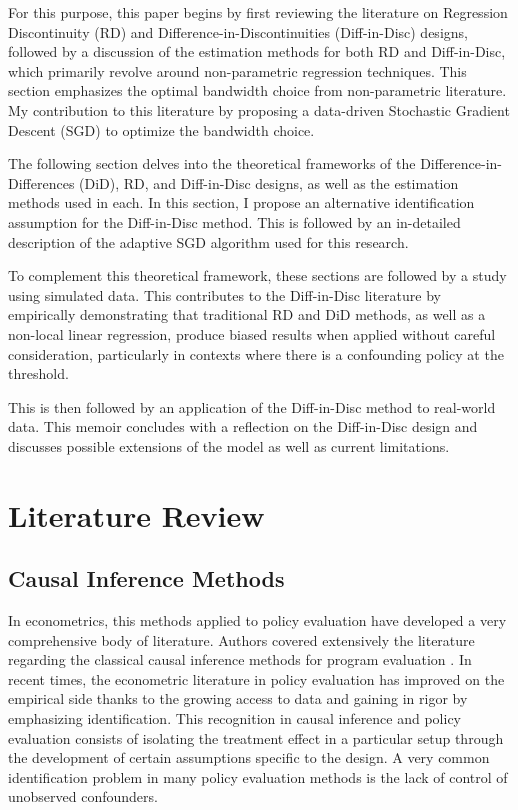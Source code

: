 \documentclass[12pt]{article}
\theoremstyle{plain}
\theoremstyle{remark}
\begin{document}
For this purpose, this paper begins by first reviewing the literature on Regression Discontinuity (RD) and Difference-in-Discontinuities (Diff-in-Disc) designs, followed by a discussion of the estimation methods for both RD and Diff-in-Disc, which primarily revolve around non-parametric regression techniques. This section emphasizes the optimal bandwidth choice from non-parametric literature. My contribution to this literature by proposing a data-driven Stochastic Gradient Descent (SGD) to optimize the bandwidth choice. 

The following section delves into the theoretical frameworks of the Difference-in-Differences (DiD), RD, and Diff-in-Disc designs, as well as the estimation methods used in each. In this section, I propose an alternative identification assumption for the Diff-in-Disc method. 
This is followed by an in-detailed description of the adaptive SGD algorithm used for this research. 

To complement this theoretical framework, these sections are followed by a study using simulated data. This contributes to the Diff-in-Disc literature by empirically demonstrating that traditional RD and DiD methods, as well as a non-local linear regression, produce biased results when applied without careful consideration, particularly in contexts where there is a confounding policy at the threshold.

This is then followed by an application of the Diff-in-Disc method to real-world data. This memoir concludes with a reflection on the Diff-in-Disc design and discusses possible extensions of the model as well as current limitations.
\newpage

\section{Literature Review}

\subsection{Causal Inference Methods}

In econometrics, this methods applied to policy evaluation have developed a very comprehensive body of literature. Authors covered extensively the literature regarding the classical causal inference methods for program evaluation \parencite{Abadie2018Econometric}. In recent times, the econometric literature in policy evaluation has improved on the empirical side thanks to the growing access to data and gaining in rigor by emphasizing identification. This recognition in causal inference and policy evaluation consists of isolating the treatment effect in a particular setup through the development of certain assumptions specific to the design. A very common identification problem in many policy evaluation methods is the lack of control of unobserved confounders.
\end{document}
